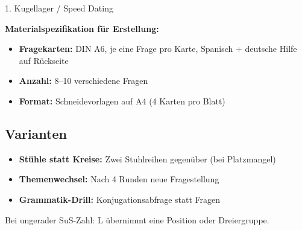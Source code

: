 \documentclass[11pt, a4paper]{article}
\begin{document}
\begin{methode}{1. Kugellager / Speed Dating}
\begin{materialbox}
\textbf{Materialspezifikation für Erstellung:}
\begin{itemize}[leftmargin=*]
    \item \textbf{Fragekarten:} DIN A6, je eine Frage pro Karte, Spanisch + deutsche Hilfe auf Rückseite
    \item \textbf{Anzahl:} 8--10 verschiedene Fragen
    \item \textbf{Format:} Schneidevorlagen auf A4 (4 Karten pro Blatt)
\end{itemize}
\end{materialbox}

\subsection*{Varianten}
\begin{itemize}[leftmargin=*]
    \item \textbf{Stühle statt Kreise:} Zwei Stuhlreihen gegenüber (bei Platzmangel)
    \item \textbf{Themenwechsel:} Nach 4 Runden neue Fragestellung
    \item \textbf{Grammatik-Drill:} Konjugationsabfrage statt Fragen
\end{itemize}

\begin{tipp}
Bei ungerader SuS-Zahl: L übernimmt eine Position oder Dreiergruppe.
\end{tipp}

\end{methode}

\vspace{1em}
\end{document}

